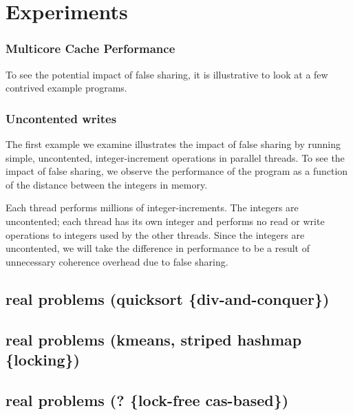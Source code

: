 \section{Experiments}
\subsubsection{Multicore Cache Performance}

To see the potential impact of false sharing, it is illustrative to look at a
few contrived example programs. 

\subsubsection{Uncontented writes}
The first example we examine illustrates the impact of false sharing by running
simple, uncontented, integer-increment operations in parallel threads. To see
the impact of false sharing, we observe the performance of the program as a
function of the distance between the integers in memory.


Each thread performs millions of integer-increments. The integers are
uncontented; each thread has its own integer and performs no read or write
operations to integers used by the other threads. Since the integers are
uncontented, we will take the difference in performance to be a result of
unnecessary coherence overhead due to false sharing.


\subsection{real problems (quicksort \{div-and-conquer\})}
\subsection{real problems (kmeans, striped hashmap \{locking\})}
\subsection{real problems (? \{lock-free cas-based\})}
